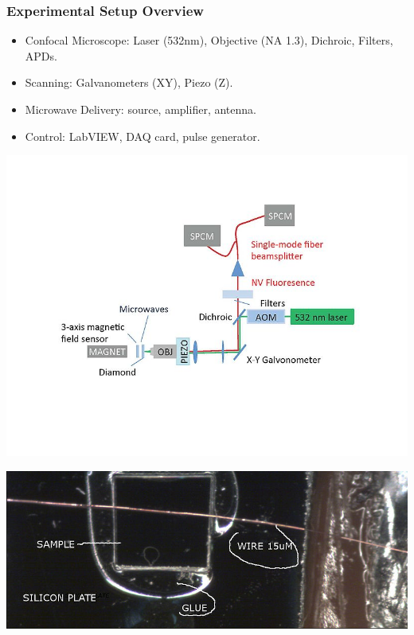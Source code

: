 \documentclass{beamer}
\begin{document}
\begin{frame}
\frametitle{Experimental Setup Overview}
\begin{itemize}
    \item Confocal Microscope: Laser (532nm), Objective (NA 1.3), Dichroic, Filters, APDs.
    \item Scanning: Galvanometers (XY), Piezo (Z).
    \item Microwave Delivery: source, amplifier, antenna. 
    \item Control: LabVIEW, DAQ card, pulse generator. 
\end{itemize}

    \begin{minipage}{0.48\textwidth}
        \centering
        \includegraphics[width=\linewidth]{presentation/figs/exptsetup.jpg}
   
    \end{minipage}
    \hfill
    \begin{minipage}{0.48\textwidth}
        \centering
        \includegraphics[width=\linewidth]{presentation/figs/sample.jpg}
       
    \end{minipage}

\end{frame}
\end{document}
